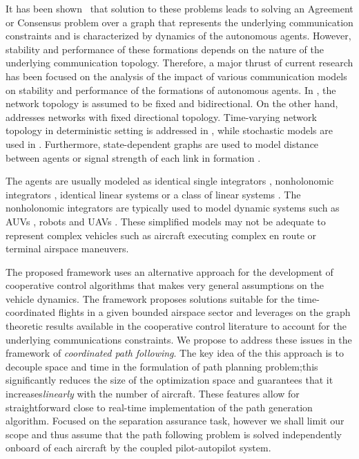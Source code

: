 \documentclass[letter,onecolumn,12pt]{aiaa-tc}
\newcommand{\1}{1_n}
\begin{document}
It has been shown~\cite{jadbabaie03,tanner05,saber07} that solution to these
problems leads to solving an Agreement or Consensus problem over a graph that represents the underlying communication
constraints and is characterized by dynamics of the autonomous agents. However, stability and
performance of these formations depends on the nature of the underlying communication topology.  Therefore, a major thrust of current research has been focused on the analysis of the impact of various communication models on stability and performance of the formations of autonomous agents. In \cite{fax04}, the network topology is assumed to be fixed and bidirectional. On the other hand, \cite{Francis-directed} addresses networks with fixed directional topology. Time-varying network topology in deterministic setting is addressed in \cite{jadbabaie03,Moreau,lin05}, while  stochastic models are used in \cite{mesbahi, Stilwell, Stilwell2}. Furthermore, state-dependent graphs are used to model distance between agents
or signal strength of each link in formation \cite{mesbahi}.

The agents are usually modeled as identical single integrators \cite{jadbabaie03,Moreau},  nonholonomic integrators
\cite{ Francis-directed,beard:coop-book,Leonard}, identical linear systems \cite{fax04} or a class of linear systems
\cite{dandrea}. The nonholonomic integrators are typically used to model dynamic systems such as AUVs \cite{Leonard},
robots \cite{Francis-directed,lin05} and UAVs \cite{mclain,beard:coop-book}. These simplified models may not
be adequate to represent complex vehicles such as aircraft executing complex en route or terminal airspace maneuvers.

The proposed framework uses an alternative approach for the development of cooperative control algorithms that makes
very general assumptions on the vehicle dynamics. The framework proposes solutions suitable for the time-coordinated flights in a given bounded airspace sector and leverages on the graph theoretic results available in the cooperative control literature to account for the underlying communications constraints. We propose to address these issues in the
framework of {\it coordinated path following}. The key idea of the this approach is to decouple space and time in the formulation of path planning problem;this significantly reduces the size of the optimization space and guarantees that it increases\emph{linearly} with the number of aircraft. These features allow for straightforward close to real-time implementation of the path generation algorithm. Focused on the separation assurance task, however we shall limit our scope and thus assume that the path following problem is solved independently onboard of each aircraft by the coupled pilot-autopilot system.
\end{document}
